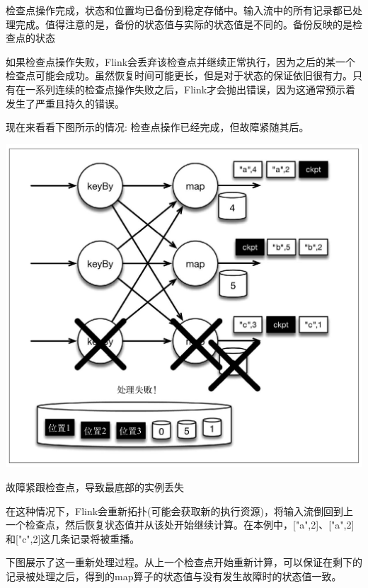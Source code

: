 \documentclass[oneside]{ctexbook}
\begin{document}
检查点操作完成，状态和位置均已备份到稳定存储中。输入流中的所有记录都已处理完成。值得注意的是，备份的状态值与实际的状态值是不同的。备份反映的是检查点的状态

如果检查点操作失败，Flink会丢弃该检查点并继续正常执行，因为之后的某一个检查点可能会成功。虽然恢复时间可能更长，但是对于状态的保证依旧很有力。只有在一系列连续的检查点操作失败之后，Flink才会抛出错误，因为这通常预示着发生了严重且持久的错误。

现在来看看下图所示的情况: 检查点操作已经完成，但故障紧随其后。

\noindent \includegraphics[width=\textwidth]{ckpt5.png}

故障紧跟检查点，导致最底部的实例丢失

在这种情况下，Flink会重新拓扑(可能会获取新的执行资源)，将输入流倒回到上一个检查点，然后恢复状态值并从该处开始继续计算。在本例中，["a",2]、["a",2]和["c",2]这几条记录将被重播。

下图展示了这一重新处理过程。从上一个检查点开始重新计算，可以保证在剩下的记录被处理之后，得到的map算子的状态值与没有发生故障时的状态值一致。
\end{document}
